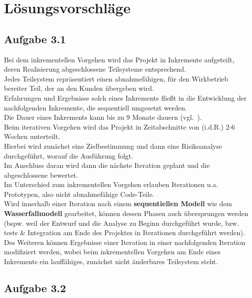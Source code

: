 \section{Lösungsvorschläge}

\subsection{Aufgabe 3.1}

Bei dem inkrementellen Vorgehen wird das Projekt in Inkremente aufgeteilt, deren Realisierung abgeschlossene Teilsysteme entsprechend.\\
Jedes Teilsystem repräsentiert einen abnahmefähigen, für den Wirkbetrieb bereiter Teil, der an den Kunden übergeben wird.\\
Erfahrungen und Ergebnisse solch eines Inkrements fließt in die Entwicklung der nachfolgenden Inkremente, die sequentiell umgesetzt werden.\\
Die Dauer eines Inkrements kann bis zu 9 Monate dauern (vgl.~\cite[84]{Wed09}).\\

\noindent
Beim iterativen Vorgehen wird das Projekt in Zeitabschnitte von (i.d.R.) 2-6 Wochen unterteilt.\\
Hierbei wird zunächst eine Zielbestimmung und dann eine Risikoanalyse durchgeführt, worauf die Ausführung folgt.\\
Im Anschluss daran wird dann die nächste Iteration geplant und die abgeschlossene bewertet.\\

\noindent
Im Unterschied zum inkrementellen Vorgehen erlauben Iterationen u.a. Prototypen, also nicht abnahmefähige Code-Teile. \\
Wird innerhalb einer Iteration nach einem \textbf{sequentiellen Modell} wie dem \textbf{Wasserfallmodell} gearbeitet, können dessen Phasen auch übersprungen werden (bspw. weil der Entwurf und die Analyse zu Beginn durchgeführt wurde, bzw. tests \& Integration am Ende des Projektes in Iterationen durchgeführt werden).\\

\noindent
Des Weiteren können Ergebnisse einer Iteration in einer nachfolgenden Iteration modifiziert werden, wobei beim inkrementellen Vorgehen am Ende eines Inkrements ein lauffähiges, zunächst nicht änderbares Teilsystem steht.

\subsection{Aufgabe 3.2}

